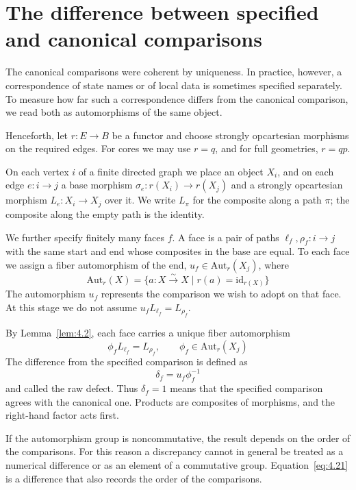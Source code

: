 \section{The difference between specified and canonical comparisons}\label{sec:4.5}

The canonical comparisons were coherent by uniqueness.
In practice, however, a correspondence of state names or of local data is sometimes
specified separately.
To measure how far such a correspondence differs from the canonical comparison, we read
both as automorphisms of the same object.

Henceforth, let $r:E\to B$ be a functor and choose strongly opcartesian
morphisms on the required edges.
For cores we may use $r=q$, and for full geometries, $r=qp$.

\begin{definition}\label{def:4.17}

On each vertex $i$ of a finite directed graph we place an object $X_i$, and on each edge
$e:i\to j$ a base morphism $\sigma_e:r(X_i)\to r(X_j)$ and a strongly opcartesian
morphism $L_e:X_i\to X_j$ over it.
We write $L_\pi$ for the composite along a path $\pi$; the composite along the empty path
is the identity.

We further specify finitely many faces $f$.
A face is a pair of paths $\ell_f,\rho_f:i\to j$ with the same start and end whose
composites in the base are equal.
To each face we assign a fiber automorphism of the end,
$u_f\in\mathrm{Aut}_r(X_j)$, where
\begin{equation*}
\mathrm{Aut}_r(X)
=\{a:X\xrightarrow{\sim}X\mid r(a)=\mathrm{id}_{r(X)}\}
\tag{4.19}\label{eq:4.19}
\end{equation*}
The automorphism $u_f$ represents the comparison we wish to adopt on that face.
At this stage we do not assume $u_fL_{\ell_f}=L_{\rho_f}$.

\end{definition}

\begin{construction}\label{cons:4.18}

By Lemma~\ref{lem:4.2}, each face carries a unique fiber automorphism
\begin{equation*}
\phi_fL_{\ell_f}=L_{\rho_f},\qquad
\phi_f\in\mathrm{Aut}_r(X_j)
\tag{4.20}\label{eq:4.20}
\end{equation*}
The difference from the specified comparison is defined as
\begin{equation*}
\delta_f=u_f\phi_f^{-1}
\tag{4.21}\label{eq:4.21}
\end{equation*}
and called the raw defect.
Thus $\delta_f=1$ means that the specified comparison agrees with the canonical one.
Products are composites of morphisms, and the right-hand factor acts first.

If the automorphism group is noncommutative, the result depends on the order of the
comparisons.
For this reason a discrepancy cannot in general be treated as a numerical difference or as
an element of a commutative group.
Equation~\eqref{eq:4.21} is a difference that also records the order of the comparisons.

\end{construction}

